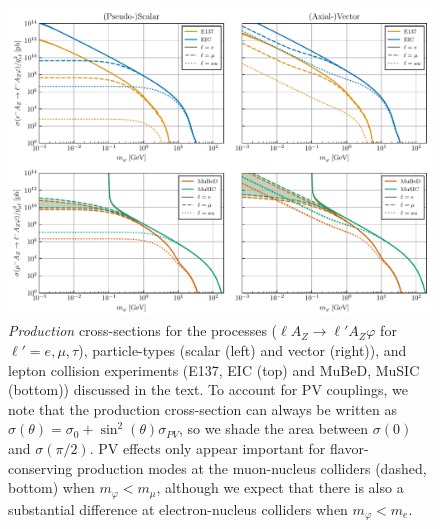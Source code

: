 \begin{figure}[t!]
    \centering
    \includegraphics[trim={1cm 0 0.5cm 0}, width=\linewidth]{figures/chapter4/production_crossx.pdf}
    \caption[Production cross-sections for the process $\ell A_Z \rightarrow \ell' A_Z\varphi$ at various lepton-nucleus collision experiments.]{{\it Production} cross-sections for the processes ($\ell A_Z \rightarrow \ell' A_Z\varphi$ for $\ell' = e,\mu,\tau$), particle-types (scalar (left) and vector (right)), and lepton collision experiments (E137, EIC (top) and MuBeD, MuSIC (bottom)) discussed in the text. To account for PV couplings, we note that the production cross-section can always be written as $\sigma(\theta) = \sigma_0 + \sin^2{(\theta)}\sigma_{PV}$, so we shade the area between $\sigma(0)$ and $\sigma(\pi/2)$. PV effects only appear important for flavor-conserving production modes at the muon-nucleus colliders (dashed, bottom) when $m_\varphi < m_\mu$, although we expect that there is also a substantial difference at electron-nucleus colliders when $m_\varphi < m_e$.}
    \label{fig:production_crossx}
\end{figure}

